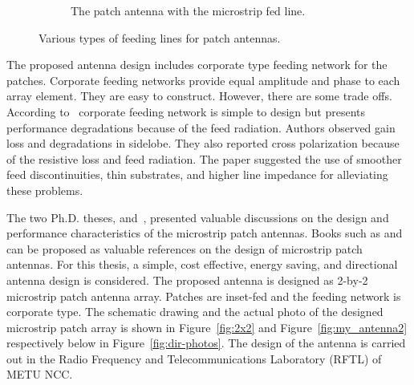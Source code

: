 \documentclass[12pt, oneandhalf, chaparabic, sees, ms]{metu}
\begin{document}
\begin{figure}[!htbp]
\begin{subfigure}[b]{0.45\textwidth}
   \caption{The patch antenna with the microstrip fed line.}
  \label{fig:mstrip}
  \end{subfigure}
  \caption{Various types of feeding lines for patch antennas.}
  \label{fig:feedings}
\end{figure}
% 
%
%
%
\vspace{-0.5cm}

The proposed antenna design includes corporate type feeding network for the patches.
Corporate feeding networks provide equal amplitude and phase to each array element.
They are easy to construct. However, there are some trade offs.
According to~\cite{hall1988} corporate feeding network is simple to design but presents performance degradations because of the feed radiation.
Authors observed gain loss and degradations in sidelobe. They also reported cross polarization because of the resistive loss and feed radiation.
The paper suggested the use of smoother feed discontinuities, thin substrates, and higher line impedance for alleviating these problems.


 
The two Ph.D. theses, \cite{deegwal2015} and~\cite{sharma2016}, presented valuable discussions on the design and performance characteristics of the microstrip patch antennas.
Books such as \cite{fang2017} and \cite{waterhouse2003} can be proposed as valuable references on the design of microstrip patch antennas.
For this thesis, a simple, cost effective, energy saving, and directional antenna design is considered.
The proposed antenna is designed as 2-by-2 microstrip patch antenna array. Patches are inset-fed and the feeding network is corporate type.
The schematic drawing and the actual photo of the designed microstrip patch array is shown in Figure~\ref{fig:2x2} and Figure~\ref{fig:my_antenna2} 
respectively below in Figure~\ref{fig:dir-photos}. The design of the antenna is carried out in the Radio Frequency and Telecommunications Laboratory (RFTL) of METU NCC.
% 
%
% 
\end{document}
